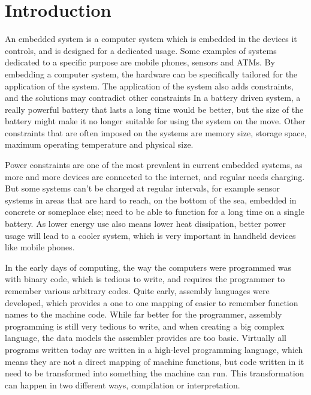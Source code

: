 \chapter{Introduction}
An embedded system is a computer system which is embedded in the devices it controls, and is designed for a dedicated usage.
Some examples of systems dedicated to a specific purpose are mobile phones, sensors and ATMs.
By embedding a computer system, the hardware can be specifically tailored for the application of the system.
The application of the system also adds constraints, and the solutions may contradict other constraints
In a battery driven system, a really powerful battery that lasts a long time would be better, but the size of the battery might make it no longer suitable for using the system on the move.
Other constraints that are often imposed on the systems are memory size, storage space, maximum operating temperature and physical size.

Power constraints are one of the most prevalent in current embedded systems, as more and more devices are connected to the internet, and regular needs charging.
But some systems can’t be charged at regular intervals, for example sensor systems in areas that are hard to reach, on the bottom of the sea, embedded in concrete or someplace else; need to be able to function for a long time on a single battery.
As lower energy use also means lower heat dissipation, better power usage will lead to a cooler system, which is very important in handheld devices like mobile phones. 

In the early days of computing, the way the computers were programmed was with binary code, which is tedious to write, and requires the programmer to remember various arbitrary codes. 
Quite early, assembly languages were developed, which provides a one to one mapping of easier to remember function names to the machine code.
While far better for the programmer, assembly programming is still very tedious to write, and when creating a big complex language, the data models the assembler provides are too basic. 
Virtually all programs written today are written in a high-level programming language, which means they are not a direct mapping of machine functions, but code written in it need to be transformed into something the machine can run. 
This transformation can happen in two different ways, compilation or interpretation. 

